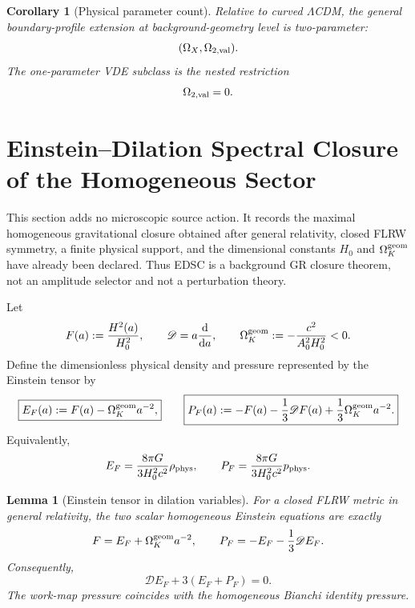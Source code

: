 \documentclass[aps,prd,preprint,onecolumn,nofootinbib,superscriptaddress,showkeys]{revtex4-2}
\numberwithin{equation}{section}
\theoremstyle{definition}
\theoremstyle{plain}
\newtheorem{lemma}{Lemma}[section]
\newtheorem{corollary}{Corollary}[section]
\newcommand{\dd}{\mathrm d}
\newcommand{\Dil}{\mathscr D}
\begin{document}
\begin{corollary}[Physical parameter count]
Relative to curved \(\Lambda\)CDM, the general boundary-profile extension at background-geometry level is two-parameter:
\begin{equation}
(\Omega_X,\Omega_{2,\rm val}).
\end{equation}
The one-parameter VDE subclass is the nested restriction
\begin{equation}
\Omega_{2,\rm val}=0.
\end{equation}
\end{corollary}



\section{Einstein--Dilation Spectral Closure of the Homogeneous Sector}\label{sec:edsc}

This section adds no microscopic source action.  It records the maximal homogeneous gravitational closure obtained after general relativity, closed FLRW symmetry, a finite physical support, and the dimensional constants \(H_0\) and \(\Omega_K^{\rm geom}\) have already been declared.  Thus EDSC is a background GR closure theorem, not an amplitude selector and not a perturbation theory.

Let
\begin{equation}
F(a):=\frac{H^2(a)}{H_0^2},
\qquad
\Dil=a\frac{\dd}{\dd a},
\qquad
\Omega_K^{\rm geom}:=-\frac{c^2}{A_0^2H_0^2}<0.
\end{equation}
Define the dimensionless physical density and pressure represented by the Einstein tensor by
\begin{equation}
\boxed{
E_F(a):=F(a)-\Omega_K^{\rm geom}a^{-2},
}
\qquad
\boxed{
P_F(a):=-F(a)-\frac13\Dil F(a)+\frac13\Omega_K^{\rm geom}a^{-2}.
}
\end{equation}
Equivalently,
\begin{equation}
E_F=\frac{8\pi G}{3H_0^2c^2}\rho_{\rm phys},
\qquad
P_F=\frac{8\pi G}{3H_0^2c^2}p_{\rm phys}.
\end{equation}

\begin{lemma}[Einstein tensor in dilation variables]\label{lem:einstein-dilation-variables}
For a closed FLRW metric in general relativity, the two scalar homogeneous Einstein equations are exactly
\begin{equation}
F=E_F+\Omega_K^{\rm geom}a^{-2},
\qquad
P_F=-E_F-\frac13\Dil E_F.
\end{equation}
Consequently,
\begin{equation}
\boxed{
\Dil E_F+3(E_F+P_F)=0.
}
\end{equation}
The work-map pressure coincides with the homogeneous Bianchi identity pressure.
\end{lemma}
\end{document}
